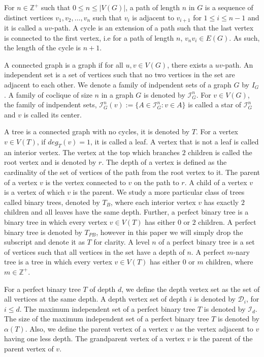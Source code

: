 \documentclass{amsart}
\theoremstyle{definition}
\begin{document}
For $n \in \mathbb{Z^+}$ such that  $0 \leq n \leq |V(G)|$, a path of length $n$ in $G$ is a sequence of distinct vertices $v_1, v_2, \ldots, v_n$ such that $v_i$ is adjacent to $v_{i+1}$ for $1 \leq i \leq n-1$ and it is called a $uv$-path. A cycle is an extension of a path such that the last vertex is connected to the first vertex, i.e for a path of length $n$, $v_nv_i \in E(G)$. As such, the length of the cycle is $n + 1$.

A connected graph is a graph if for all $u,v \in V(G)$, there exists a $uv$-path. An independent set is a set of vertices such that no two vertices in the set are adjacent to each other. We denote a family of indpendent sets of a graph $G$ by $I_G$. A family of coclique of size $n$ in a graph $G$ is denoted by $\mathcal{I}^n_G$. For $v \in V(G)$, the family of indpendent sets, $\mathcal{I}^n_G(v) := \{A \in \mathcal{I}^n_G : v \in A\}$ is called a star of $\mathcal{I}^n_G$ and $v$ is called its center.

A tree is a connected graph with no cycles, it is denoted by $T$. For a vertex $v \in V(T)$, if $deg_T(v) = 1$, it is called a leaf. A vertex that is not a leaf is called an interior vertex. The vertex at the top which branches $2$ children is called the root vertex and is denoted by $r$. The depth of a vertex is defined as the cardinality of the set of vertices of the path from the root vertex to it. The parent of a vertex $v$ is the vertex connected to $v$ on the path to $r$. A child of a vertex $v$ is a vertex of which $v$ is the parent. We study a more particular class of trees called binary trees, denoted by $T_B$, where each interior vertex $v$ has exactly $2$ children and all leaves have the same depth. Further, a perfect binary tree is a binary tree in which every vertex $v \in V(T)$ has either $0$ or $2$ children. A perfect binary tree is denoted by $T_{PB}$, however in this paper we will simply drop the subscript and denote it as $T$ for clarity. A level $n$ of a perfect binary tree is a set of vertices such that all vertices in the set have a depth of $n$. A perfect $m$-nary tree is a tree in which every vertex $v \in V(T)$ has either $0$ or $m$ children, where $m \in \mathbb{Z}^+$.

For a perfect binary tree $T$ of depth $d$, we define the depth vertex set as the set of all vertices at the same depth. A depth vertex set of depth $i$ is denoted by $\mathcal{D}_i$, for $i \leq d$. The maximum independent set of a perfect binary tree $T$ is denoted by $\mathcal{I}_d$. The size of the maximum independent set of a perfect binary tree $T$ is denoted by $\alpha(T)$. Also, we define the parent vertex of a vertex $v$ as the vertex adjacent to $v$ having one less depth. The grandparent vertex of a vertex $v$ is the parent of the parent vertex of $v$.
\end{document}
